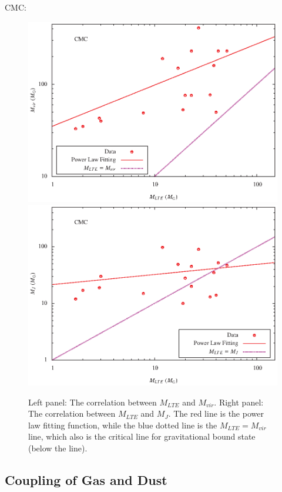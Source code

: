 \documentclass{article}
\begin{document}
\newpage

CMC:

\begin{figure}[h]
\includegraphics[totalheight=40mm]{M_vir_cmc.eps}
\includegraphics[totalheight=40mm]{M_j_cmc.eps}

{Left panel: The correlation between $M_{LTE}$ and $M_{vir}$. Right panel: The correlation between $M_{LTE}$ and $M_{J}$. The red line is the power law fitting function, while the blue dotted line is the $M_{LTE}=M_{vir}$line, which also is the critical line for gravitational bound state (below the line).}
\end{figure}
\newpage

\subsection{Coupling of Gas and Dust}
\end{document}
